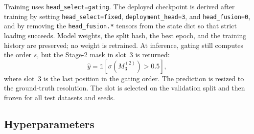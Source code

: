 Training uses \texttt{head\_select=gating}. The deployed checkpoint is derived
after training by setting \texttt{head\_select=fixed},
\texttt{deployment\_head=3}, and \texttt{head\_fusion=0}, and by removing the
\texttt{head\_fusion.*} tensors from the state dict so that strict loading
succeeds. Model weights, the split hash, the best epoch, and the training
history are preserved; no weight is retrained. At inference, gating still
computes the order $s$, but the Stage-2 mask in slot~3 is returned:
\begin{equation}
\hat y=\mathbb{1}\!\left[\sigma\!\left(M_3^{(2)}\right)>0.5\right],
\end{equation}
where slot~3 is the last position in the gating order. The prediction is
resized to the ground-truth resolution. The slot is selected on the
validation split and then frozen for all test datasets and seeds.

\subsection{Hyperparameters}
\label{sec:supp_hyper}

